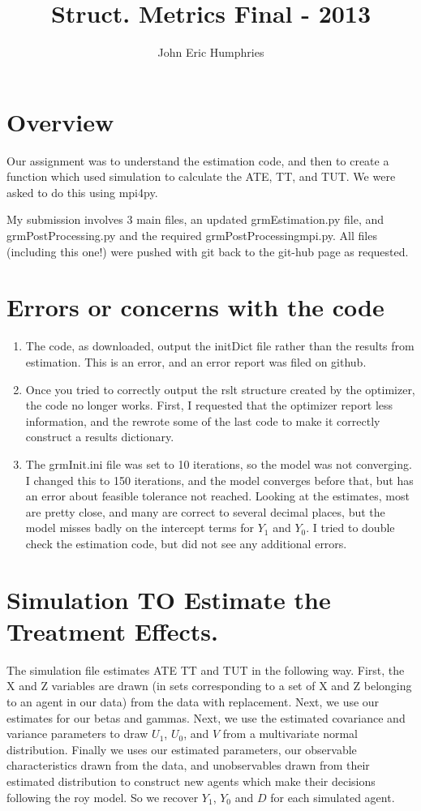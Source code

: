 \documentclass{article}
\title{Struct. Metrics Final - 2013}
\author{John Eric Humphries}
\begin{document}
\maketitle

\section{Overview}

Our assignment was to understand the estimation code, and then to create a function which used simulation to calculate the ATE, TT, and TUT. We were asked to do this using mpi4py.

My submission involves 3 main files, an updated grmEstimation.py file, and grmPostProcessing.py and the required grmPostProcessingmpi.py. All files (including this one!) were pushed with git back to the git-hub page as requested.

\section{Errors or concerns with the code}
\begin{enumerate}
\item The code, as downloaded, output the initDict file rather than the results from estimation. This is an error, and an error report was filed on github.
\item Once you tried to correctly output the rslt structure created by the optimizer, the code no longer works. First, I requested that the optimizer report less information, and the rewrote some of the last code to make it correctly construct a results dictionary.
\item The grmInit.ini file was set to 10 iterations, so the model was not converging. I changed this to 150 iterations, and the model converges before that, but has an error about feasible tolerance not reached. Looking at the estimates, most are pretty close, and many are correct to several decimal places, but the model misses badly on the intercept terms for $Y_1$ and $Y_0$. I tried to double check the estimation code, but did not see any additional errors.
\end{enumerate}

\section{Simulation TO Estimate the Treatment Effects.}
The simulation file estimates ATE TT and TUT in the following way. First, the X and Z variables are drawn (in sets corresponding to a set of X and Z belonging to an agent in our data) from the data with replacement. Next, we use our estimates for our betas and gammas. Next, we use the estimated covariance and variance parameters to draw $U_1$, $U_0$, and $V$ from a multivariate normal distribution. Finally we uses our estimated parameters, our observable characteristics drawn from the data, and unobservables drawn from their estimated distribution to construct new agents which make their decisions following the roy model. So we recover $Y_1$, $Y_0$ and $D$ for each simulated agent. 
\end{document}

